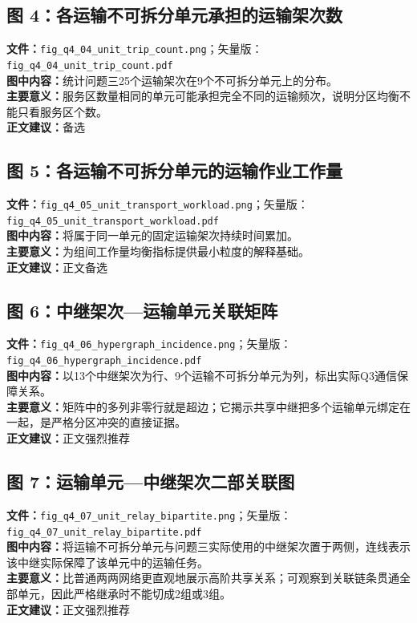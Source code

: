 \subsection*{图 4：各运输不可拆分单元承担的运输架次数}
\textbf{文件：}\texttt{fig\_q4\_04\_unit\_trip\_count.png}；矢量版：\texttt{fig\_q4\_04\_unit\_trip\_count.pdf}\\
\textbf{图中内容：}统计问题三25个运输架次在9个不可拆分单元上的分布。\\
\textbf{主要意义：}服务区数量相同的单元可能承担完全不同的运输频次，说明分区均衡不能只看服务区个数。\\
\textbf{正文建议：}备选

\subsection*{图 5：各运输不可拆分单元的运输作业工作量}
\textbf{文件：}\texttt{fig\_q4\_05\_unit\_transport\_workload.png}；矢量版：\texttt{fig\_q4\_05\_unit\_transport\_workload.pdf}\\
\textbf{图中内容：}将属于同一单元的固定运输架次持续时间累加。\\
\textbf{主要意义：}为组间工作量均衡指标提供最小粒度的解释基础。\\
\textbf{正文建议：}正文备选

\subsection*{图 6：中继架次—运输单元关联矩阵}
\textbf{文件：}\texttt{fig\_q4\_06\_hypergraph\_incidence.png}；矢量版：\texttt{fig\_q4\_06\_hypergraph\_incidence.pdf}\\
\textbf{图中内容：}以13个中继架次为行、9个运输不可拆分单元为列，标出实际Q3通信保障关系。\\
\textbf{主要意义：}矩阵中的多列非零行就是超边；它揭示共享中继把多个运输单元绑定在一起，是严格分区冲突的直接证据。\\
\textbf{正文建议：}正文强烈推荐

\subsection*{图 7：运输单元—中继架次二部关联图}
\textbf{文件：}\texttt{fig\_q4\_07\_unit\_relay\_bipartite.png}；矢量版：\texttt{fig\_q4\_07\_unit\_relay\_bipartite.pdf}\\
\textbf{图中内容：}将运输不可拆分单元与问题三实际使用的中继架次置于两侧，连线表示该中继实际保障了该单元中的运输任务。\\
\textbf{主要意义：}比普通两两网络更直观地展示高阶共享关系；可观察到关联链条贯通全部单元，因此严格继承时不能切成2组或3组。\\
\textbf{正文建议：}正文强烈推荐

